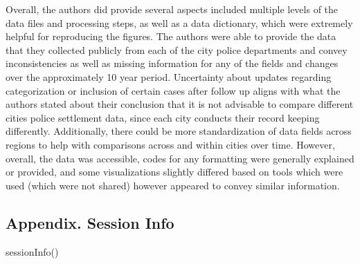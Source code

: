 \documentclass[
  letterpaper,
  DIV=11,
  numbers=noendperiod]{scrartcl}
\newenvironment{Shaded}{\begin{snugshade}}{\end{snugshade}}
\newcommand{\FunctionTok}[1]{\textcolor[rgb]{0.28,0.35,0.67}{#1}}
\newcommand{\NormalTok}[1]{\textcolor[rgb]{0.00,0.23,0.31}{#1}}
\begin{document}
Overall, the authors did provide several aspects included multiple
levels of the data files and processing steps, as well as a data
dictionary, which were extremely helpful for reproducing the figures.
The authors were able to provide the data that they collected publicly
from each of the city police departments and convey inconsistencies as
well as missing information for any of the fields and changes over the
approximately 10 year period. Uncertainty about updates regarding
categorization or inclusion of certain cases after follow up aligns with
what the authors stated about their conclusion that it is not advisable
to compare different cities police settlement data, since each city
conducts their record keeping differently. Additionally, there could be
more standardization of data fields across regions to help with
comparisons across and within cities over time. However, overall, the
data was accessible, codes for any formatting were generally explained
or provided, and some visualizations slightly differed based on tools
which were used (which were not shared) however appeared to convey
similar information.

\subsection{Appendix. Session Info}\label{appendix.-session-info}

\begin{Shaded}
\begin{Highlighting}[]
\FunctionTok{sessionInfo}\NormalTok{()}
\end{Highlighting}
\end{Shaded}
\end{document}
